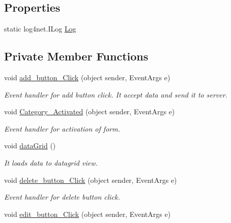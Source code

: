 \subsection*{Properties}
\begin{DoxyCompactItemize}
\item 
static log4net.\+I\+Log \hyperlink{classWildlifeTrackingApp_1_1Category_a5fc9abb86e6110ecd61d0a1a7d740a8a}{Log}
\end{DoxyCompactItemize}
\subsection*{Private Member Functions}
\begin{DoxyCompactItemize}
\item 
void \hyperlink{classWildlifeTrackingApp_1_1Category_ae56b21bee08f5cad9858a264ccc21fd5}{add\+\_\+button\+\_\+\+Click} (object sender, Event\+Args e)
\begin{DoxyCompactList}\small\item\em Event handler for add button click. It accept data and send it to server. \end{DoxyCompactList}\item 
void \hyperlink{classWildlifeTrackingApp_1_1Category_ad88debab69dc59b9a3bc2bdd89b1e4f9}{Category\+\_\+\+Activated} (object sender, Event\+Args e)
\begin{DoxyCompactList}\small\item\em Event handler for activation of form. \end{DoxyCompactList}\item 
void \hyperlink{classWildlifeTrackingApp_1_1Category_af87e0d54e9971bfe9ccba3a85841f619}{data\+Grid} ()
\begin{DoxyCompactList}\small\item\em It loads data to datagrid view. \end{DoxyCompactList}\item 
void \hyperlink{classWildlifeTrackingApp_1_1Category_a28f46cdb401c2c8da3f8e117eaedf977}{delete\+\_\+button\+\_\+\+Click} (object sender, Event\+Args e)
\begin{DoxyCompactList}\small\item\em Event handler for delete button click. \end{DoxyCompactList}\item 
void \hyperlink{classWildlifeTrackingApp_1_1Category_adef76d49a202d1276ec8ca56b5b0bd3b}{edit\+\_\+button\+\_\+\+Click} (object sender, Event\+Args e)

\end{DoxyCompactItemize}
